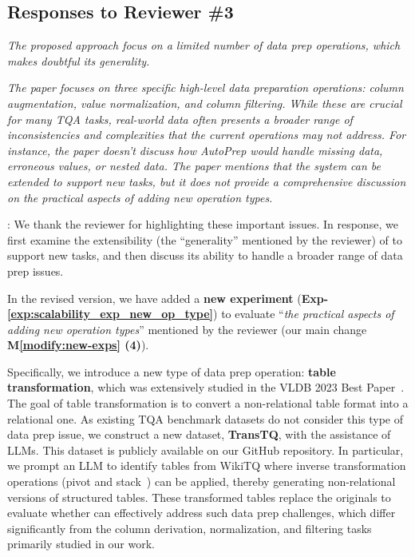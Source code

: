 \subsection*{Responses to Reviewer \#3}
\label{cover_letter:r3}

\begin{shaded}
{
\emph{The proposed approach focus on a limited number of data prep operations, which makes doubtful its generality.}

\emph{The paper focuses on three specific high-level data preparation operations: column augmentation, value normalization, and column filtering. While these are crucial for many TQA tasks, real-world data often presents a broader range of inconsistencies and complexities that the current operations may not address. For instance, the paper doesn't discuss how AutoPrep would handle missing data, erroneous values, or nested data. The paper mentions that the system can be extended to support new tasks, but it does not provide a comprehensive discussion on the practical aspects of adding new operation types.}
}
\end{shaded}

: 
We thank the reviewer for highlighting these important issues.
In response, we first examine the extensibility (\ie the ``generality'' mentioned by the reviewer) of \sys to support new tasks, and then discuss its ability to handle a broader range of data prep issues.

In the revised version, we have added a \textbf{new experiment} (\ie \textbf{Exp-\ref{exp:scalability_exp_new_op_type}}) to evaluate ``\emph{the practical aspects of adding new operation types}'' mentioned by the reviewer (our main change \textbf{M\ref{modify:new-exps} (4)}). 

Specifically, we introduce a new type of data prep operation: \textbf{table transformation}, which was extensively studied in the VLDB 2023 Best Paper~\cite{li2023auto}. The goal of table transformation is to convert a non-relational table format into a relational one. As existing TQA benchmark datasets do not consider this type of data prep issue, we construct a new dataset, \textbf{TransTQ}, with the assistance of LLMs. This dataset is publicly available on our GitHub repository. In particular, we prompt an LLM to identify tables from WikiTQ where inverse transformation operations (\eg pivot and stack~\cite{li2023auto}) can be applied, thereby generating non-relational versions of structured tables. These transformed tables replace the originals to evaluate whether \sys can effectively address such data prep challenges, which differ significantly from the column derivation, normalization, and filtering tasks primarily studied in our work.

